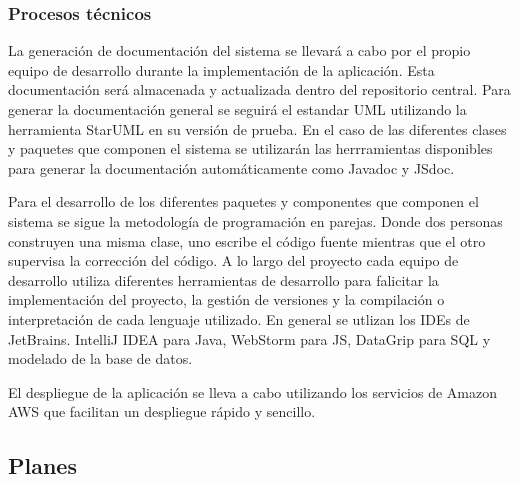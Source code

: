 \subsubsection{Procesos técnicos}

La generación de documentación del sistema se llevará a cabo por el propio equipo de desarrollo durante la implementación de la aplicación. Esta documentación será almacenada y actualizada dentro del repositorio central. Para generar la documentación general se seguirá el estandar UML utilizando la herramienta StarUML en su versión de prueba. En el caso de las diferentes clases y paquetes que componen el sistema se utilizarán las herrramientas disponibles para generar la documentación automáticamente como Javadoc y JSdoc.

Para el desarrollo de los diferentes paquetes y componentes que componen el sistema se sigue la metodología de programación en parejas. Donde dos personas construyen una misma clase, uno escribe el código fuente mientras que el otro supervisa la corrección del código. A lo largo del proyecto cada equipo de desarrollo utiliza diferentes herramientas de desarrollo para falicitar la implementación del proyecto, la gestión de versiones y la compilación o interpretación de cada lenguaje utilizado. En general se utlizan los IDEs de JetBrains. IntelliJ IDEA para Java, WebStorm para JS, DataGrip para SQL y modelado de la base de datos.

El despliegue de la aplicación se lleva a cabo utilizando los servicios de Amazon AWS que facilitan un despliegue rápido y sencillo.

\subsection{Planes}
\label{pl}
